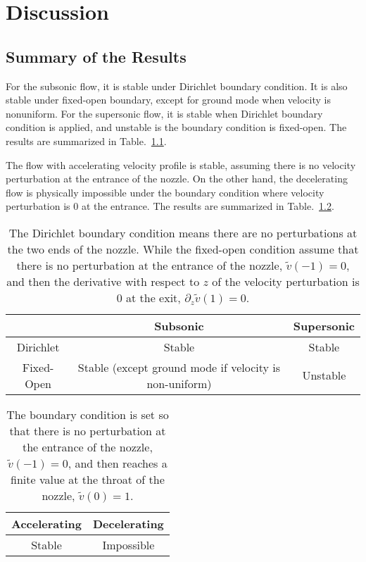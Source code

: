 \chapter{Discussion} \label{chap:discussion}
\section{Summary of the Results}
For the subsonic flow, it is stable under Dirichlet boundary condition. It is also stable under fixed-open boundary, except for ground mode when velocity is nonuniform. For the supersonic flow, it is stable when Dirichlet boundary condition is applied, and unstable is the boundary condition is fixed-open. The results are summarized in Table.~\ref{table:results-subsonic-supersonic}.

The flow with accelerating velocity profile is stable, assuming there is no velocity perturbation at the entrance of the nozzle. On the other hand, the decelerating flow is physically impossible under the boundary condition where velocity perturbation is 0 at the entrance. The results are summarized in Table.~\ref{table:results-accelerating-decelerating}.

\begin{table} [htbp]
	\centering
	\begin{tabular}{| c | c | c |}
		\hline
		           & Subsonic                                               & Supersonic \\
		\hline
		Dirichlet  & Stable                                                 & Stable     \\
		\hline
		Fixed-Open & Stable (except ground mode if velocity is non-uniform) & Unstable   \\
		\hline
	\end{tabular}
	\caption{The Dirichlet boundary condition means there are no perturbations at the two ends of the nozzle. While the fixed-open condition assume that there is no perturbation at the entrance of the nozzle, $\tilde{v}(-1)=0$, and then the derivative with respect to $z$ of the velocity perturbation is 0 at the exit, $\partial_z\tilde{v}(1)=0$.}
	\label{table:results-subsonic-supersonic}
\end{table}

\begin{table} [htbp]
	\centering
	\begin{tabular}{|c | c|}
		\hline
		Accelerating & Decelerating \\
		\hline
		Stable       & Impossible   \\
		\hline
	\end{tabular}
	\caption{The boundary condition is set so that there is no perturbation at the entrance of the nozzle, $\tilde{v}(-1)=0$, and then reaches a finite value at the throat of the nozzle, $\tilde{v}(0)=1$.}
	\label{table:results-accelerating-decelerating}
\end{table}

